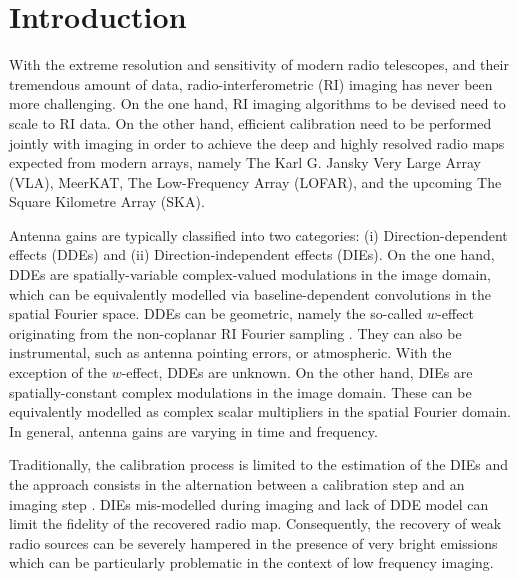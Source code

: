 \documentclass[fleqn,usenatbib]{mnras}
\begin{document}
\section{Introduction} \label{sec:intro}
With the extreme resolution and sensitivity of modern radio telescopes, and their tremendous amount of data, radio-interferometric (RI) imaging has never been more challenging. On the one hand, RI imaging algorithms to be devised need to scale to RI data. On the other hand, efficient calibration need to be performed jointly with imaging in order to achieve the deep and highly resolved radio maps expected from modern arrays, namely The Karl G. Jansky Very Large Array ({{VLA}}), MeerKAT, The Low-Frequency Array ({{LOFAR}}), and the upcoming The Square Kilometre Array (SKA).

Antenna gains are typically classified into two categories: (i) Direction-dependent effects (DDEs) and (ii) Direction-independent effects (DIEs). On the one hand, DDEs are spatially-variable complex-valued modulations in the image domain, which can be equivalently modelled via baseline-dependent convolutions in the spatial Fourier space. DDEs can be geometric, namely the so-called $w$-effect originating from the non-coplanar RI Fourier sampling {{\citep{Cornwell1992}}}. They can also be instrumental, such as antenna pointing errors, or atmospheric. With the exception of the $w$-effect, DDEs are unknown. {On the other hand,} DIEs are spatially-constant complex modulations in the image domain. These can be equivalently modelled as complex scalar multipliers in the spatial Fourier domain. In general, antenna gains are varying in time and frequency.

Traditionally, the calibration process is limited to the estimation of the {DIEs} and the approach consists in the alternation between a calibration step and an imaging step \citep{Mitchell2008,Salvini2014}. DIEs mis-modelled during imaging and lack of DDE model can limit the fidelity of the recovered radio map. Consequently, the recovery of weak radio sources can be severely hampered in the presence of very bright emissions which can be particularly problematic in the context of low frequency imaging. 
\end{document}
